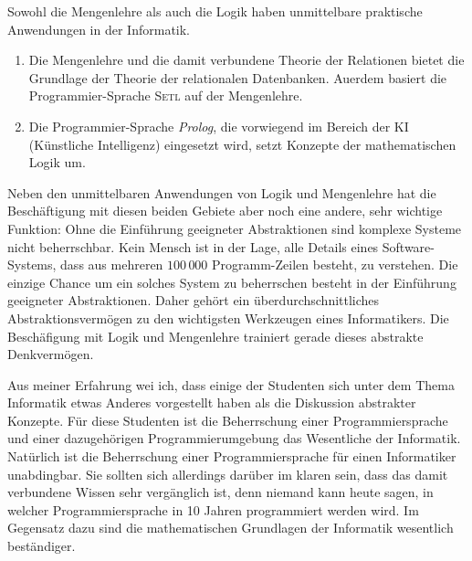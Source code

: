 Sowohl die Mengenlehre als auch die Logik haben unmittelbare praktische Anwendungen in der
Informatik.
\begin{enumerate}
\item Die Mengenlehre und die damit verbundene Theorie der Relationen bietet die Grundlage
      der Theorie der relationalen Datenbanken.  Au\3erdem basiert die Programmier-Sprache \textsc{Setl}
      auf der Mengenlehre.
\item Die Programmier-Sprache \textsl{Prolog}, die vorwiegend im Bereich der KI
      (K\"{u}nstliche Intelligenz) eingesetzt wird, setzt Konzepte der mathematischen
      Logik um.  
\end{enumerate}
Neben den unmittelbaren Anwendungen von Logik und Mengenlehre hat die Besch\"{a}ftigung mit
diesen beiden Gebiete aber noch eine andere, sehr wichtige Funktion:
Ohne die Einf\"{u}hrung geeigneter Abstraktionen sind komplexe Systeme nicht beherrschbar.
Kein Mensch ist in der Lage, alle Details eines Software-Systems, dass aus mehreren
$100\,000$ Programm-Zeilen besteht, zu verstehen.   Die einzige Chance um ein solches
System zu beherrschen besteht in der Einf\"{u}hrung geeigneter Abstraktionen.
Daher geh\"{o}rt ein \"{u}berdurchschnittliches Abstraktionsverm\"{o}gen zu den wichtigsten Werkzeugen
eines Informatikers.  Die Besch\"{a}figung mit Logik und Mengenlehre trainiert gerade dieses
abstrakte Denkverm\"{o}gen. 


Aus meiner Erfahrung wei\3 ich, dass einige der Studenten sich unter dem Thema Informatik etwas Anderes
vorgestellt haben als die Diskussion abstrakter Konzepte.  F\"{u}r diese Studenten ist die Beherrschung
einer Programmiersprache und einer dazugeh\"{o}rigen Programmierumgebung das Wesentliche der Informatik.
Nat\"{u}rlich ist die Beherrschung einer Programmiersprache f\"{u}r einen Informatiker unabdingbar.  Sie
sollten sich allerdings dar\"{u}ber im klaren sein, dass das damit verbundene Wissen sehr verg\"{a}nglich
ist, denn niemand kann heute sagen, in welcher Programmiersprache in 10 Jahren programmiert werden wird.
Im Gegensatz dazu sind die mathematischen Grundlagen der Informatik wesentlich best\"{a}ndiger.


